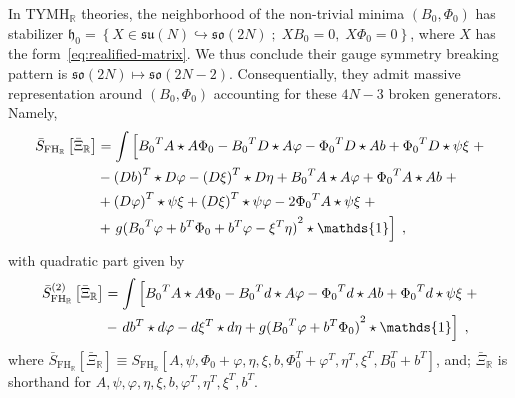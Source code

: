 \documentclass[../main.tex]{subfiles}
\begin{document}
In TYMH$_{\mathbb{R}}$ theories, the neighborhood of the non-trivial minima $(B_0,\Phi_0)$ has stabilizer $\mathfrak{h}_0 = \left\{ X \in \mathfrak{su}(N) \hookrightarrow \mathfrak{so}(2N) \; ; \; X B_0 = 0, \; X \Phi_0 = 0 \right\} $, where $X$ has the form~\eqref{eq:realified-matrix}. We thus conclude their gauge symmetry breaking pattern is $\mathfrak{so}(2N) \mapsto \mathfrak{so}(2N-2)$. Consequentially, they admit massive representation around $(B_{0}, \Phi_{0})$ accounting for these $4N-3$ broken generators. Namely,
\begin{align}
  \label{eq:real-eff-action}
  \bar{S}_{\text{FH}_\mathbb{R}} \left[ {\bar{\Xi}}_{\mathbb{R}} \right] & = \int \left[ \vphantom{m^2} {B_0}^T A \star A \Phi_0 - {B_0}^T D \star A \varphi - {\Phi_0}^{T} D \star A b + {\Phi_0}^{T} D \star \psi \xi \right. +  \nonumber \\
                                                                                    & - {(Db)}^{T} \star D \varphi - {(D \xi)}^{T} \star D \eta + {B_0}^{T} A \star A \varphi + {\Phi_0}^{T} A \star A b  \; +  \nonumber                               \\
                                                                                    & + {(D \varphi)}^{T} \star \psi \xi + {(D \xi)}^{T} \star \psi \varphi - 2 {\Phi_0}^{T} A \star \psi \xi \; + \nonumber                                            \\
                                                                                    & + \left. g {( {B_0}^{T} \varphi + b^T \Phi_0 + b^T \varphi - \xi^T \eta )}^2 \star \mathds{1} \right] \;,
\end{align}
with quadratic part given by
\begin{align}%
  \label{eq:real-eff-quad-action}
  \bar{S}^{(2)}_{\text{FH}_\mathbb{R}} \left[ {\bar{\Xi}}_{\mathbb{R}} \right] & = \int \left[ \vphantom{m^2} {B_0}^T A \star A \Phi_0 - {B_0}^T d \star A \varphi - {\Phi_0}^{T} d \star A b + {\Phi_0}^{T} d \star \psi \xi \right. +  \nonumber \\
                                                                                          & - \left. d b^T \star d \varphi - d \xi^T \star d \eta +  g {( {B_0}^{T} \varphi + b^T \Phi_0 )}^2 \star \mathds{1} \right] \;,
\end{align}
where $\bar{S}_{\text{FH}_\mathbb{R}} [ {\bar{\Xi}}_{\mathbb{R}} ] \equiv S_{\text{FH}_\mathbb{R}} [ A, \psi, \Phi_0 + \varphi, \eta, \xi, b, \Phi^T_0 + \varphi^T, \eta^T, \xi^T, B^T_0 + b^T] $, and; ${\bar{\Xi}}_{\mathbb{R}}$ is shorthand for $A, \psi, \varphi, \eta, \xi, b, \varphi^T, \eta^T, \xi^T, b^T$.
\end{document}
